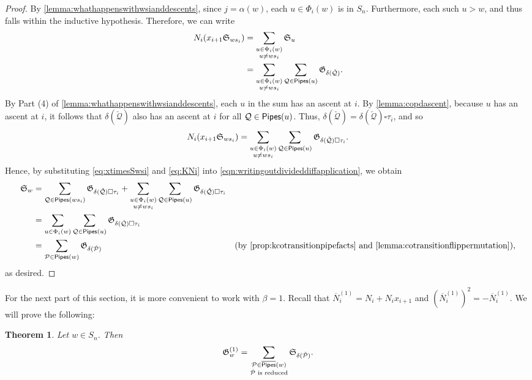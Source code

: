 \documentclass[12 pt]{amsart}
\newcommand{\addable}{\alpha}
\newtheorem{theorem}[Theorem]{Theorem}
\numberwithin{equation}{section}
\theoremstyle{remark}
\newcommand{\pipes}{{\sf Pipes}}
\newcommand{\kpipes}{\overline{\sf Pipes}}
\newcommand{\demprod}{\delta}
\newcommand{\divdiff}{N}
\newcommand{\kdivdiff}{\overline{N}}
\newcommand{\cotransitionperms}{\Phi}
\begin{document}
\begin{proof}
			By \cref{lemma:whathappenswithwsianddescents}, since $j=\addable(w)$, each $u \in \cotransitionperms_i(w)$ is in $S_n$. 
			Furthermore, each such $u > w$, and thus falls within the inductive hypothesis. 
			Therefore, we can write
			\begin{align*}
				\divdiff_i(x_{i + 1}\mathfrak{S}_{ws_i})
				& = \sum_{\substack{u \in \cotransitionperms_i(w)\\u \neq ws_i}}\mathfrak{S}_{u}\\
				& = \sum_{\substack{u \in \cotransitionperms_i(w)\\u \neq ws_i}}\sum_{\mathcal{Q} \in \pipes(u)}\mathfrak{G}_{\demprod(\check{\mathcal{Q}})}.
			\end{align*}
			By Part (4) of \cref{lemma:whathappenswithwsianddescents}, each $u$ in the sum has an ascent at $i$. 
			By \cref{lemma:copdascent}, because $u$ has an ascent at $i$, it follows that $\demprod(\check{\mathcal{Q}})$ also has an ascent at $i$ for all $\mathcal{Q} \in \pipes(u)$. 
			Thus, $\demprod(\check{\mathcal{Q}}) = \demprod(\check{\mathcal{Q}})\square \tau_i$, and so
			\begin{equation}
				\label{eq:xtimesSwsi}
			\divdiff_i(x_{i + 1}\mathfrak{S}_{ws_i}) = \sum_{\substack{u \in \cotransitionperms_i(w)\\u \neq ws_i}}\sum_{\mathcal{Q} \in \pipes(u)}\mathfrak{G}_{\demprod(\check{\mathcal{Q}})\square \tau_i}.
			\end{equation}
			Hence, by substituting \cref{eq:xtimesSwsi} and \cref{eq:KNi} into \cref{eqn:writingoutdivideddiffapplication}, we obtain
			\begin{align*}
				\mathfrak{S}_{w}
				& = \sum_{\mathcal{Q} \in \pipes(ws_i)} \mathfrak{G}_{\demprod(\check{\mathcal{Q}})\square \tau_i} + \sum_{\substack{u \in \cotransitionperms_i(w)\\u \neq ws_i}}\sum_{\mathcal{Q} \in \pipes(u)}\mathfrak{G}_{\demprod(\check{\mathcal{Q}})\square \tau_i}\\
				& = \sum_{u \in \cotransitionperms_i(w)}\sum_{\mathcal{Q} \in \pipes(u)}\mathfrak{G}_{\demprod(\check{\mathcal{Q}})\square \tau_i}\\
				& = \sum_{\mathcal{P} \in \pipes(w)}\mathfrak{G}_{\demprod(\check{\mathcal{P}})} & (\text{by \cref{prop:kcotransitionpipefacts} and \cref{lemma:cotransitionflippermutation}}),
			\end{align*}
			as desired.
		\end{proof}
		
		For the next part of this section, it is more convenient to work with $\beta = 1$. Recall that $\kdivdiff_i^{(1)} = \divdiff_i + \divdiff_ix_{i + 1}$ and $(\kdivdiff_i^{(1)})^2 = -\kdivdiff_i^{(1)}$.
		We will prove the following:
		\begin{theorem}
			\label{thm:pipe_groth_to_schub_no_signs}
			Let $w \in S_n$. Then
			\[\mathfrak{G}_w^{(1)} = \sum_{\substack{\mathcal{P} \in \kpipes(w)\\ \check{\mathcal{P}} \text{ is reduced}}}\mathfrak{S}_{\demprod(\check{\mathcal{P}})}. \]
		\end{theorem}
		
\end{document}
